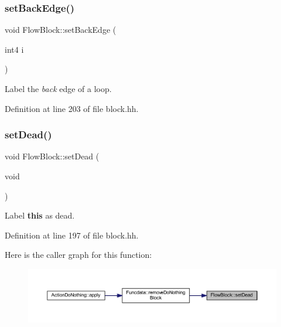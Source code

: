 \subsubsection{\texorpdfstring{setBackEdge()}{setBackEdge()}}
{\footnotesize\ttfamily void Flow\+Block\+::set\+Back\+Edge (\begin{DoxyParamCaption}\item[{int4}]{i }\end{DoxyParamCaption})\hspace{0.3cm}{\ttfamily [inline]}}



Label the {\itshape back} edge of a loop. 



Definition at line 203 of file block.\+hh.

\mbox{\label{class_flow_block_a782f5f62072869fd9f093e7c58567a00}} 
\subsubsection{\texorpdfstring{setDead()}{setDead()}}
{\footnotesize\ttfamily void Flow\+Block\+::set\+Dead (\begin{DoxyParamCaption}\item[{void}]{ }\end{DoxyParamCaption})\hspace{0.3cm}{\ttfamily [inline]}}



Label {\bfseries{this}} as dead. 



Definition at line 197 of file block.\+hh.

Here is the caller graph for this function\+:
\nopagebreak
\begin{figure}[H]
\begin{center}
\leavevmode
\includegraphics[width=350pt]{class_flow_block_a782f5f62072869fd9f093e7c58567a00_icgraph}
\end{center}
\end{figure}
\mbox{\label{class_flow_block_a0056fb3c60ff3449a313171dee202c76}} 
